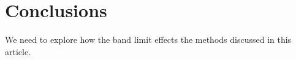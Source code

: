\section{Conclusions}

We need to explore how the band limit effects the methods discussed in this article.